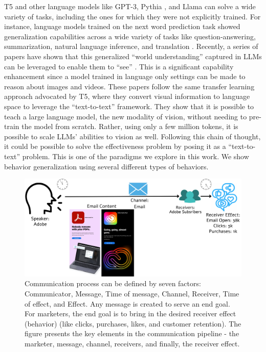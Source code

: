 T5 and other language models like GPT-3, Pythia \cite{biderman2023pythia}, and Llama \cite{touvron2023llama} can solve a wide variety of tasks, including the ones for which they were not explicitly trained. For instance, language models trained on the next word prediction task showed generalization capabilities across a wide variety of tasks like question-answering, summarization, natural language inference, and translation \cite{brown2020language}. Recently, a series of papers have shown that this generalized ``world understanding'' captured in LLMs can be leveraged to enable them to ``see'' \cite{liu2023visual,li2023videochat,li2023blip2,zhu2023minigpt,ge2023planting,zhang2023video,bhattacharyya-etal-2023-video}. This is a significant capability enhancement since a model trained in language only settings can be made to reason about images and videos. These papers follow the same transfer learning approach advocated by T5, where they convert visual information to language space to leverage the ``text-to-text'' framework. They show that it is possible to teach a large language model, the new modality of vision, without needing to pre-train the model from scratch. Rather, using only a few million tokens, it is possible to scale LLMs' abilities to vision as well. Following this chain of thought, it could be possible to solve the effectiveness problem by posing it as a ``text-to-text'' problem. This is one of the paradigms we explore in this work. We show behavior generalization using several different types of behaviors.

\begin{figure}[!t]
  \centering
  \includegraphics[width=1.0\textwidth]{images/factors of communication.pdf}
  \caption{Communication process can be defined by seven factors: Communicator, Message, Time of message, Channel, Receiver, Time of effect, and Effect. Any message is created to serve an end goal. For marketers, the end goal is to bring in the desired receiver effect (behavior) (like clicks, purchases, likes, and customer retention). The figure presents the key elements in the communication pipeline - the marketer, message, channel, receivers, and finally, the receiver effect. \label{fig:factors-of-communication-chapter-lcbm}}
\end{figure}


